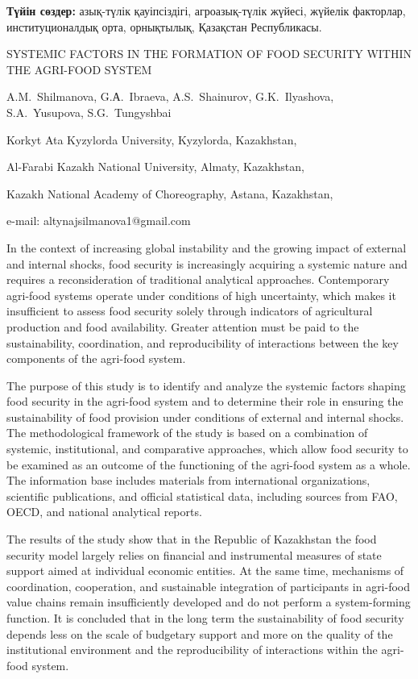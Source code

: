 {\bfseries Түйін сөздер:} азық-түлік қауіпсіздігі, агроазық-түлік жүйесі,
жүйелік факторлар, институционалдық орта, орнықтылық, Қазақстан
Республикасы.

\begin{header}
SYSTEMIC FACTORS IN THE FORMATION OF FOOD SECURITY WITHIN THE AGRI-FOOD SYSTEM

A.M.~Shilmanova\envelope,
G.А.~Ibraeva,
A.S.~Shainurov,
G.K.~Ilyashova,
S.A.~Yusupova,
S.G.~Tungyshbai
\end{header}

\begin{affil}
Korkyt Ata Kyzylorda University, Kyzylorda, Kazakhstan,

Al-Farabi Kazakh National University, Almaty, Kazakhstan,

Kazakh National Academy of Choreography, Astana, Kazakhstan,

e-mail: altynajsilmanova1@gmail.com
\end{affil}

In the context of increasing global instability and the growing impact
of external and internal shocks, food security is increasingly acquiring
a systemic nature and requires a reconsideration of traditional
analytical approaches. Contemporary agri-food systems operate under
conditions of high uncertainty, which makes it insufficient to assess
food security solely through indicators of agricultural production and
food availability. Greater attention must be paid to the sustainability,
coordination, and reproducibility of interactions between the key
components of the agri-food system.

The purpose of this study is to identify and analyze the systemic
factors shaping food security in the agri-food system and to determine
their role in ensuring the sustainability of food provision under
conditions of external and internal shocks. The methodological framework
of the study is based on a combination of systemic, institutional, and
comparative approaches, which allow food security to be examined as an
outcome of the functioning of the agri-food system as a whole. The
information base includes materials from international organizations,
scientific publications, and official statistical data, including
sources from FAO, OECD, and national analytical reports.

The results of the study show that in the Republic of Kazakhstan the
food security model largely relies on financial and instrumental
measures of state support aimed at individual economic entities. At the
same time, mechanisms of coordination, cooperation, and sustainable
integration of participants in agri-food value chains remain
insufficiently developed and do not perform a system-forming function.
It is concluded that in the long term the sustainability of food
security depends less on the scale of budgetary support and more on the
quality of the institutional environment and the reproducibility of
interactions within the agri-food system.

